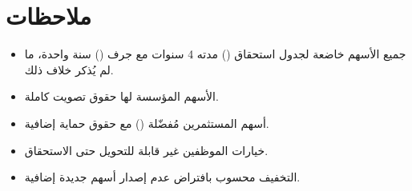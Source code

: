 \documentclass[11pt,a4paper,landscape]{article}
\begin{document}
\section*{ملاحظات}
\begin{itemize}
    \item جميع الأسهم خاضعة لجدول استحقاق () مدته 4 سنوات مع جرف () سنة واحدة، ما لم يُذكر خلاف ذلك.
    \item الأسهم المؤسسة لها حقوق تصويت كاملة.
    \item أسهم المستثمرين مُفضّلة () مع حقوق حماية إضافية.
    \item خيارات الموظفين غير قابلة للتحويل حتى الاستحقاق.
    \item التخفيف محسوب بافتراض عدم إصدار أسهم جديدة إضافية.
\end{itemize}
\end{document}
